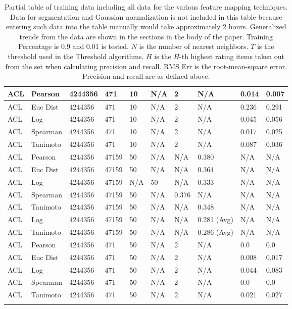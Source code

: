 \documentclass{article}
\begin{document}
\begin{longtable}{ |p{1.7cm}|p{1.9cm}|p{1.5cm}|p{1.5cm}|p{0.75cm}|p{0.75cm}|p{0.75cm}|p{0.75cm}|p{1.5cm}|p{1.5cm}|}
    ACL  & Pearson & 4244356 & 471 & 10 & N/A  & 2 & N/A & 0.014 & 0.007  \\ \hline
    ACL  & Euc Dist & 4244356 & 471 & 10 & N/A  & 2 & N/A &0.236 & 0.291   \\ \hline
    ACL  & Log & 4244356 & 471 & 10 & N/A & 2 & N/A & 0.045 & 0.056  \\ \hline
    ACL  & Spearman & 4244356 & 471 & 10 & N/A  & 2 & N/A &0.017 & 0.025 \\ \hline
    ACL  & Tanimoto & 4244356 & 471 & 10 & N/A  & 2 & N/A & 0.087 & 0.036 \\ \hline
    
    ACL & Pearson & 4244356 & 47159 & 50 & N/A & N/A & 0.380 & N/A & N/A  \\ \hline
    ACL & Euc Dist & 4244356 & 47159 & 50 & N/A & N/A & 0.364 & N/A & N/A   \\ \hline
    ACL & Log & 4244356 & 47159 & N/A &  50 & N/A& 0.333 & N/A & N/A  \\ \hline
    ACL & Spearman & 4244356 & 47159 & 50 & N/A & 0.376 & N/A & N/A & N/A \\ \hline
    ACL & Tanimoto & 4244356 & 47159 & 50 & N/A& N/A & 0.348 & N/A & N/A \\ \hline
    ACL & Log & 4244356 & 47159 & 50 & N/A& N/A & 0.281 (Avg) & N/A & N/A \\ \hline
    ACL & Tanimoto & 4244356 & 47159 & 50 & N/A & N/A & 0.286 (Avg) & N/A & N/A \\ \hline
    
    ACL  & Pearson & 4244356 & 471 & 50 & N/A  & 2 & N/A & 0.0 & 0.0  \\ \hline
    ACL  & Euc Dist & 4244356 & 471 & 50 & N/A  & 2 & N/A &0.008 & 0.017   \\ \hline
    ACL  & Log & 4244356 & 471 & 50 & N/A & 2 & N/A & 0.044 & 0.083  \\ \hline
    ACL  & Spearman & 4244356 & 471 & 50 & N/A  & 2 & N/A &0.0 & 0.0 \\ \hline
    ACL  & Tanimoto & 4244356 & 471 & 50 & N/A  & 2 & N/A & 0.021 & 0.027 \\ \hline

    \hline
    \caption{Partial table of training data including all data for the various feature mapping techniques. Data for 
    segmentation and Gaussian normalization is not included in this table because entering such data into the table
    manually would take approximately 2 hours. Generalized trends from the data are shown in the sections in the body
    of the paper. Training Percentage is $0.9$ and $0.01$ is tested. 
    $N$ is the number of nearest neighbors. $T$ is the threshold
    used in the Threshold algorithms. $H$ is the $H$-th highest rating items taken out from the set when calculating 
    precision and recall. RMS Err is the root-mean-square error. Precision and recall are as defined above.}\label{results-basic}
\end{longtable}


\end{document}
